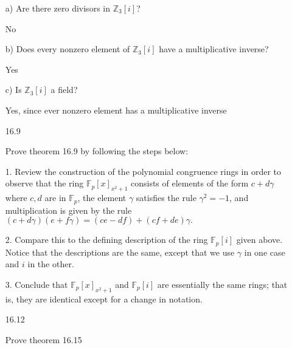 \documentclass[12pt]{article}
\begin{document}
\begin{itemize}
a) Are there zero divisors in $\mathbb{Z}_3[i]$?

No

b) Does every nonzero element of $\mathbb{Z}_3[i]$ have a multiplicative inverse?

Yes

c) Is $\mathbb{Z}_3[i]$ a field?

Yes, since ever nonzero element has a multiplicative inverse

\newpage
\item[16.9]

Prove theorem 16.9 by following the steps below:

1. Review the construction of the polynomial congruence rings in order to observe that the ring $\mathbb{F}_p[x]_{x^2 + 1}$ consists of elements of the form $c+d\gamma$ where $c, d$ are in $\mathbb{F}_p$, the element $\gamma$ satisfies the rule $\gamma^2 = -1$, and multiplication is given by the rule $(c + d\gamma)(e + f\gamma) = (ce - df) + (cf + de)\gamma.$

2. Compare this to the defining description of the ring $\mathbb{F}_p[i]$ given above. Notice that the descriptions are the same, except that we use $\gamma$ in one case and $i$ in the other.

3. Conclude that $\mathbb{F}_p[x]_{x^2+1}$ and $\mathbb{F}_p[i]$ are essentially the same rings; that is, they are identical except for a change in notation.

\newpage
\item[16.12]

Prove theorem 16.15


\end{itemize}
\end{document}
